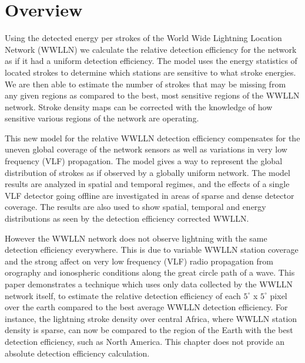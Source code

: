\section{Overview}

Using the detected energy per strokes of the World Wide Lightning Location Network (WWLLN) we calculate the relative detection efficiency for the network as if it had a uniform  detection efficiency.
The model uses the energy statistics of located strokes to determine which stations are sensitive to what stroke energies.
We are then able to estimate the number of strokes that may be missing from any given regions as compared to the best, most sensitive regions of the WWLLN network.
Stroke density maps can be corrected with the knowledge of how sensitive various regions of the network are operating.

This new model for the relative WWLLN detection efficiency compensates for the uneven global coverage of the network sensors as well as variations in very low frequency (VLF) propagation.
The model gives a way to represent the global distribution of strokes as if observed by a globally uniform network.
The model results are analyzed in spatial and temporal regimes, and the effects of a single VLF detector going offline are investigated in areas of sparse and dense detector coverage.
The results are also used to show spatial, temporal and energy distributions as seen by the detection efficiency corrected WWLLN.

However the WWLLN network does not observe lightning with the same detection efficiency everywhere.
This is due to variable WWLLN station coverage and the strong affect on very low frequency (VLF) radio propagation from orography and ionospheric conditions along the great circle path of a wave.
This paper demonstrates a technique which uses only data collected by the WWLLN network itself, to estimate the relative detection efficiency of each $5^\circ$ x $5^\circ$ pixel over the earth compared to the best average WWLLN detection efficiency.
For instance, the lightning stroke density over central Africa, where WWLLN station density is sparse, can now be compared to the region of the Earth with the best detection efficiency, such as North America.
This chapter does not provide an absolute detection efficiency calculation.

